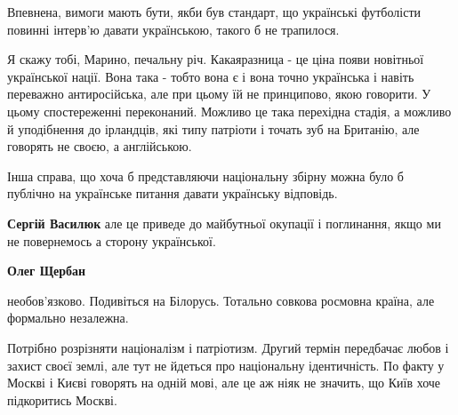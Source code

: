 \begin{itemize}
Впевнена, вимоги мають бути, якби був стандарт, що українські футболісти
повинні інтерв'ю давати українською, такого б не трапилося.

 

Я скажу тобі, Марино, печальну річ. Какаяразница - це ціна появи новітньої
української нації. Вона така - тобто вона є і вона точно українська і навіть
переважно антиросійська, але при цьому їй не принципово, якою говорити. У цьому
спостереженні переконаний. Можливо це така перехідна стадія, а можливо й
уподібнення до ірландців, які типу патріоти і точать зуб на Британію, але
говорять не своєю, а англійською.

\begin{itemize}
 
Інша справа, що хоча б представляючи національну збірну можна було б публічно на українське питання давати українську відповідь.

 
\textbf{Сергій Василюк} але це приведе до майбутньої окупації і поглинання, якщо ми не повернемось а сторону української.

 
\textbf{Олег Щербан} 

необов'язково. Подивіться на Білорусь. Тотально совкова росмовна країна, але формально незалежна.

Потрібно розрізняти націоналізм і патріотизм. Другий термін передбачає любов і
захист своєї землі, але тут не йдеться про національну ідентичність. По факту у
Москві і Києві говорять на одній мові, але це аж ніяк не значить, що Київ хоче
підкоритись Москві.


\end{itemize}
\end{itemize}
